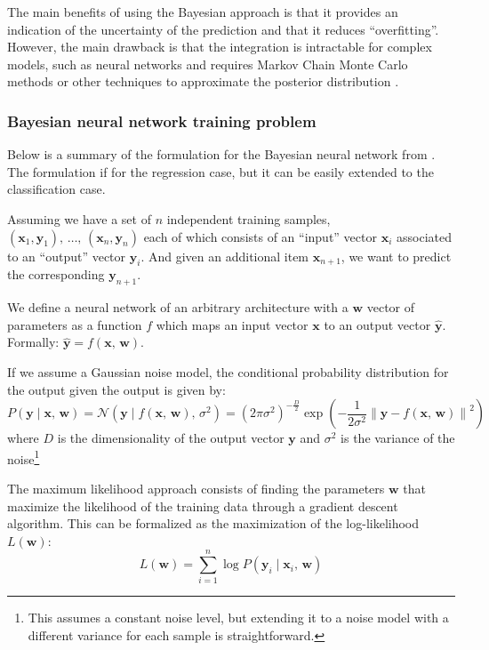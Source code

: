 The main benefits of using the Bayesian approach is that it provides an
indication of the uncertainty of the prediction and that it reduces ``overfitting''.
However, the main drawback is that the integration is intractable for
complex models, such as neural networks and requires Markov Chain Monte Carlo
methods or other techniques to approximate the posterior distribution \cite{nealBayesianTrainingBackpropagation1992}.

\subsubsection{Bayesian neural network training problem}%
\label{ssub:bayesian_neural_network_training_problem}

Below is a summary of the formulation for the Bayesian neural network from \textcite{nealBayesianTrainingBackpropagation1992}.
The formulation if for the regression case, but it can be easily extended to the classification case.

Assuming we have a set of $n$ independent training samples,
$\left(\textbf{x}_1,  \textbf{y}_1 \right),\,\dots,\,\left(\textbf{x}_n,  \textbf{y}_n \right)$
each of which consists of an ``input'' vector $\textbf{x}_i$ associated to an ``output'' vector $\textbf{y}_i$.
And given an additional item $\textbf{x}_{n+1}$, we want to predict the corresponding $\textbf{y}_{n+1}$.

We define a neural network of an arbitrary architecture with a $\textbf{w}$ vector of parameters as a function
$f$ which maps an input vector $\textbf{x}$ to an output vector $\widehat{\textbf{y}}$. Formally: $\widehat{\textbf{y}} = f(\textbf{x},\,\textbf{w})$.

If we assume a Gaussian noise model, the conditional probability distribution for the output given the output is given by:
\begin{equation}
    P(\textbf{y} \mid \textbf{x},\,\textbf{w}) = \mathcal{N}(\textbf{y} \mid f(\textbf{x},\,\textbf{w}),\,\sigma^2)
    = \left(2\pi\sigma^2\right)^{-\frac{D}{2}} \exp \left( -\frac{1}{2\sigma^2} \left\lVert \textbf{y} - f(\textbf{x},\,\textbf{w}) \right\rVert^2 \right)
\end{equation}
where $D$ is the dimensionality of the output vector $\textbf{y}$ and $\sigma^2$ is the variance of the noise\footnote{
    This assumes a constant noise level, but extending it to a noise model with a different variance for each sample is straightforward.
}

The maximum likelihood approach consists of finding the parameters $\textbf{w}$ that maximize the likelihood of the training data
through a gradient descent algorithm. This can be formalized as the maximization of the log-likelihood $L(\textbf{w})$:
\begin{equation}%
    \label{eq:log_likelihood}
    L(\textbf{w}) = \sum_{i=1}^{n} \log P(\textbf{y}_i \mid \textbf{x}_i,\,\textbf{w})
\end{equation}

